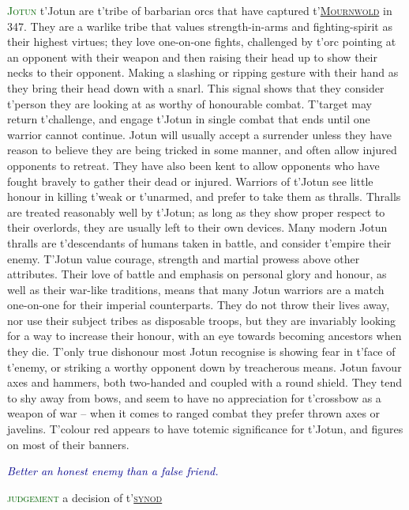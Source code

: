 \documentclass[twoside,11pt,b5paper,twocolumn]{scrbook}
\newcommand{\estcab}[1]{\textsc{\textcolor{marron}{#1}}}
\newcommand{\keyword}[1]{\textcolor{darkgreen}{#1}}
\renewcommand{\paragraph}[1]{\par\noindent\markboth{#1}{#1}\estcab{\keyword{#1}}\label{#1} }
\newcommand{\see}[1]{{\estcab{\hyperref[#1]{#1}}}}
\newcommand{\proverb}[1]{\par \textcolor{darkblue}{\itshape #1}}
\begin{document}
\paragraph{Jotun} t'Jotun are t'tribe of barbarian orcs that have captured t'\see{Mournwold} in 347. They are a warlike tribe that values strength-in-arms and fighting-spirit as their highest virtues; they love one-on-one fights, challenged by t'orc pointing at an opponent with their weapon and then raising their head up to show their necks to their opponent. Making a slashing or ripping gesture with their hand as they bring their head down with a snarl. This signal shows that they consider t'person they are looking at as worthy of honourable combat. T'target may return t'challenge, and engage t'Jotun in single combat that ends until one warrior cannot continue. Jotun will usually accept a surrender unless they have reason to believe they are being tricked in some manner, and often allow injured opponents to retreat. They have also been kent to allow opponents who have fought bravely to gather their dead or injured. Warriors of t'Jotun see little honour in killing t'weak or t'unarmed, and prefer to take them as thralls. Thralls are treated reasonably well by t'Jotun; as long as they show proper respect to their overlords, they are usually left to their own devices. Many modern Jotun thralls are t'descendants of humans taken in battle, and consider t'empire their enemy. T'Jotun value courage, strength and martial prowess above other attributes. Their love of battle and emphasis on personal glory and honour, as well as their war-like traditions, means that many Jotun warriors are a match one-on-one for their imperial counterparts. They do not throw their lives away, nor use their subject tribes as disposable troops, but they are invariably looking for a way to increase their honour, with an eye towards becoming ancestors when they die. T'only true dishonour most Jotun recognise is showing fear in t'face of t'enemy, or striking a worthy opponent down by treacherous means. Jotun favour axes and hammers, both two-handed and coupled with a round shield. They tend to shy away from bows, and seem to have no appreciation for t'crossbow as a weapon of war – when it comes to ranged combat they prefer thrown axes or javelins. T'colour red appears to have totemic significance for t'Jotun, and figures on most of their banners. \proverb{Better an honest enemy than a false friend.}
\paragraph{judgement} a decision of t'\see{synod}
\end{document}
